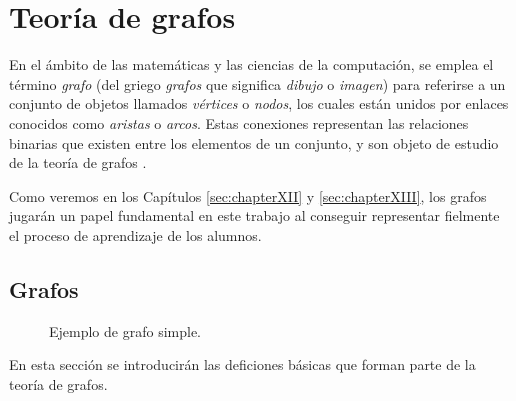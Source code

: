 \chapter{Teoría de grafos}\label{sec:chapterV}

En el ámbito de las matemáticas y las ciencias de la computación, se emplea el término \emph{grafo} (del griego \emph{grafos} que significa \emph{dibujo} o \emph{imagen}) para referirse a un conjunto de objetos llamados \emph{vértices} o \emph{nodos}, los cuales están unidos por enlaces conocidos como \emph{aristas} o \emph{arcos}. Estas conexiones representan las relaciones binarias que existen entre los elementos de un conjunto, y son objeto de estudio de la teoría de grafos \cite{IJSRCSEIT:graph_theory_applications}.

Como veremos en los Capítulos \ref{sec:chapterXII} y \ref{sec:chapterXIII}, los grafos jugarán un papel fundamental en este trabajo al conseguir representar fielmente el proceso de aprendizaje de los alumnos.

\section{Grafos}

\begin{wrapfigure}{r}{0.4\textwidth}
\centering
{}
\caption{Ejemplo de grafo simple.}
\label{fig:grafo1}
\end{wrapfigure}

En esta sección se introducirán las deficiones básicas que forman parte de la teoría de grafos.

